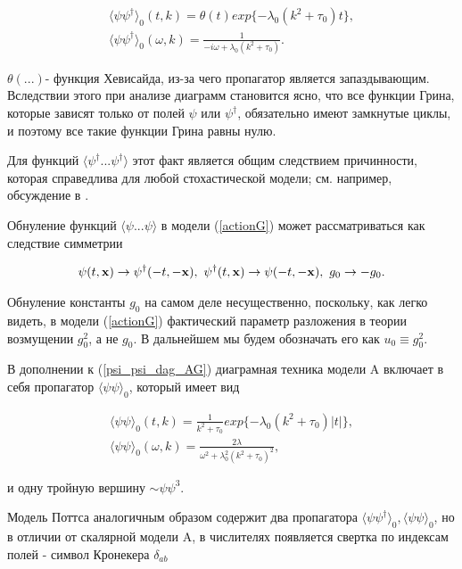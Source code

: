 \documentclass []{rusthesis} %
\def\x{{\bf x}}
\begin{document}
\begin{eqnarray}
\langle \psi \psi^{\dag}\rangle_0(t,k) = \theta(t)exp\{-\lambda_0(k^2+\tau_0)t\}, \nonumber \\ 
\langle \psi \psi^{\dag}\rangle_0(\omega,k) = \frac{1}{-i\omega + \lambda_0(k^2+\tau_0)}.
\label{psi_psi_dag_AG}
\end{eqnarray}

$\theta(...)$- функция Хевисайда, из-за чего пропагатор является запаздывающим. 
Вследствии этого при анализе диаграмм становится ясно, что все функции Грина, которые зависят только от полей $\psi$ или $\psi^{\dag}$, обязательно имеют замкнутые циклы, и поэтому все такие функции Грина равны нулю.

Для функций $\langle \psi^{\dag}... \psi^{\dag}\rangle$ этот факт является общим следствием причинности, которая справедлива для любой стохастической модели; см. например, обсуждение в \cite{Book3}.

Обнуление функций $\langle \psi...\psi \rangle$ в модели (\ref{actionG}) может рассматриваться как следствие симметрии

\begin{eqnarray}
\psi(t,\x) \rightarrow \psi^{\dag} (-t,-\x), \
\psi^{\dag}(t,\x)\rightarrow\psi(-t,-\x), \
g_0 \rightarrow -g_0.
\label{symm_G}
\end{eqnarray}

Обнуление константы $g_0$ на самом деле несущественно, поскольку, как легко видеть, в модели (\ref{actionG}) фактический параметр разложения в теории возмущении $g_0^2$, а не $g_0$. В дальнейшем мы будем обозначать его как $u_0 \equiv g_0^2$.

В дополнении к (\ref{psi_psi_dag_AG}) диаграмная техника модели A включает в себя пропагатор $\langle \psi \psi \rangle_0$, который имеет вид

\begin{eqnarray}
\langle \psi \psi\rangle_0(t,k) = \frac{1}{k^2+\tau_0}exp\{-\lambda_0(k^2+\tau_0)|t|\}, \nonumber \\ 
\langle \psi \psi\rangle_0(\omega,k) = \frac{2\lambda}{\omega^2 + \lambda_0^2(k^2+\tau_0)^2},
\label{psi_psi_A}
\end{eqnarray}

и одну тройную вершину $\sim \psi \psi^3$.

Модель Поттса аналогичным образом содержит два пропагатора $\langle \psi \psi^{\dag} \rangle_0, \langle \psi \psi \rangle_0$, но в отличии от скалярной модели A, в числителях появляется свертка по индексам полей - символ Кронекера $\delta_{ab}$
\end{document}
